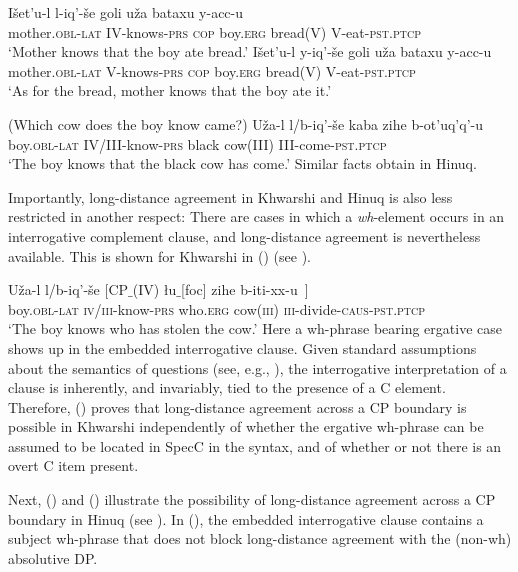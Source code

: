 \documentclass[output=paper
,modfonts
,nonflat]{langsci/langscibook}
\begin{document}
\ea\label{ex:mueller:16}
\ea
\gll I\v{s}et'u-l l-iq'-\v{s}e goli u\v{z}a bataxu y-acc-u \\
 mother.{\scshape obl-lat} IV-knows-{\scshape prs} {\scshape cop} boy.{\scshape erg} bread(V) V-eat-{\scshape pst.ptcp} \\
\glt `Mother knows that the boy ate bread.'
\ex  
\gll I\v{s}et'u-l \label{16-b}y-iq'-\v{s}e goli u\v{z}a bataxu y-acc-u \\
  mother.{\scshape obl-lat} V-knows-{\scshape prs} {\scshape cop} boy.{\scshape erg}  bread(V) V-eat-{\scshape pst.ptcp} \\
\glt `As for the bread, mother knows that  the boy ate it.'
\z
\z

\ea\label{ex:mueller:17}
\ea (Which cow does the boy know came?)
\ex
\gll  U\v{z}a-l l/b-iq'-\v{s}e \label{17-b}k\textsuperscript{}aba zihe b-ot'uq'q'-u \\
  boy.{\scshape obl-lat} IV/III-know-{\scshape prs} black cow(III) III-come-{\scshape pst.ptcp} \\
\glt `The boy knows that the black cow has come.'
\z
\z
Similar facts obtain in Hinuq.  

Importantly, long-distance agreement in Khwarshi and Hinuq is also less
restricted in another respect:
There are cases in which a {\em wh}-element occurs in
     an interrogative  complement clause, and long-distance agreement is nevertheless
     available. This is shown for Khwarshi in (\Next) (see \cite{Khalilova09}). 

\ea\label{ex:mueller:18}
\gll U\v{z}a-l l/b-iq'-\v{s}e [CP$\_${\rm (IV)} \l \label{cp1}u$\_${\rm [foc]} zihe b-iti-xx-u~] \\
boy.{\scshape obl-lat} {\scshape iv/iii}-know-{\scshape prs} {} who.{\scshape erg} cow({\scshape iii}) {\scshape iii}-divide-{\scshape caus-pst.ptcp} \\
\glt `The boy knows who has stolen the cow.'
\z
Here a wh-phrase bearing ergative case shows up in the embedded
interrogative clause. Given standard assumptions about the
semantics of questions (see, e.g., \cite{Stechow:96:aga}),
the interrogative interpretation of a clause is inherently, and
invariably, tied to the presence of a C element. Therefore, (\Last)
proves that long-distance agreement across a CP boundary is possible
in Khwarshi independently of whether the ergative wh-phrase can be
assumed to be located in SpecC in the syntax, and of whether or not
there is an overt C item present. 

Next, (\Next) and (\NNext) illustrate the possibility of long-distance
agreement across a CP boundary in Hinuq (see \cite{Forker:11}). In
(\Next), the embedded interrogative clause contains a subject
wh-phrase that does not block long-distance agreement with the
(non-wh) absolutive DP. 
\end{document}
